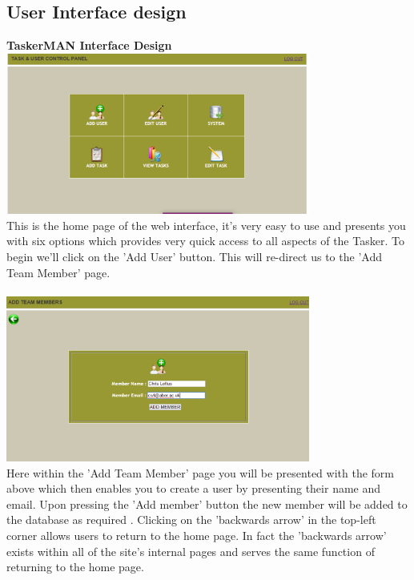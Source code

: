 \documentclass{project}
\begin{document}
\subsection{User Interface design}
\textbf{TaskerMAN Interface Design} \\
\newline
\includegraphics[width=0.75\textwidth, center]{images/5.2/TaskerMANHomePage} \\
This is the home page of the web interface, it's very easy to use and presents you with six options which provides very quick access to all aspects of the Tasker. To begin we'll click on the 'Add User' button. This will re-direct us to the 'Add Team Member' page. \\~\\
\newline
\includegraphics[width=0.75\textwidth, center]{images/5.2/TaskerMANAddUser} \\
Here within the 'Add Team Member' page you will be presented with the form above which then enables you to create a user by presenting their name and email. Upon pressing the 'Add member' button the new member will be added to the database as required \cite{se.qa.rs fr3}. Clicking on the 'backwards arrow' in the top-left corner allows users to return to the home page. In fact the 'backwards arrow' exists within all of the site's internal pages and serves the same function of returning to the home page. \\~\\
\end{document}
